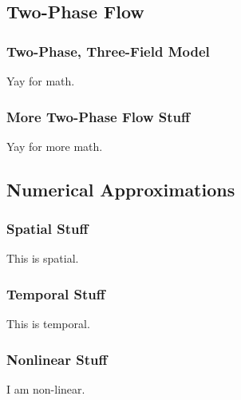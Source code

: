 \documentclass[compress]{beamer}
\begin{document}
\subsection[Two-Phase Flow]{Two-Phase Flow}
\begin{frame}
\frametitle{Two-Phase, Three-Field Model}

Yay for math.

\end{frame}
\begin{frame}
\frametitle{More Two-Phase Flow Stuff}

Yay for more math.

\end{frame}
\subsection[Numeric Approximation]{Numerical Approximations}
\begin{frame}
\frametitle{Spatial Stuff}

This is spatial.

\end{frame}
\begin{frame}
\frametitle{Temporal Stuff}

This is temporal.

\end{frame}
\begin{frame}
\frametitle{Nonlinear Stuff}

I am non-linear.

\end{frame}
\end{document}
